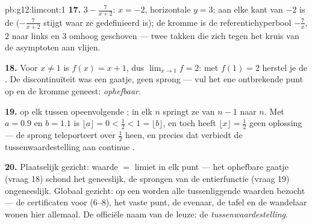 \begin{solution}{pb:g12:limcont:1}
\textbf{17.} $3 - \frac{7}{x + 2}$:  $x = -2$, horizontale
$y = 3$; aan elke kant van $-2$ is de   ($-\frac{7}{x+2}$
stijgt waar ze gedefinieerd is); de kromme is de referentiehyperbool
$-\frac7x$, $2$ naar links en $3$ omhoog geschoven --- twee takken die zich
tegen het kruis van de asymptoten aan vlijen.

\textbf{18.} Voor $x \neq 1$ is $f(x) = x + 1$, dus $\lim_{x \to 1} f = 2$:
met $f(1) = 2$ herstel je de . De discontinuïteit was een gaatje,
geen sprong --- vul het ene ontbrekende punt op en de kromme geneest:
\emph{ophefbaar}.

\textbf{19.}  op elk  tussen opeenvolgende ; in
elk  $n$ springt ze van $n - 1$ naar $n$. Met $a = 0.9$ en
$b = 1.1$ is $\lfloor a \rfloor = 0 < \frac12 < 1 = \lfloor b \rfloor$, en
toch heeft $\lfloor x \rfloor = \frac12$ geen oplossing --- de sprong
teleporteert over $\frac12$ heen, en precies dat verbiedt de
tussenwaardestelling aan continue .

\textbf{20.} Plaatselijk gezicht: waarde $=$ limiet in elk punt --- het
ophefbare gaatje (vraag 18) schond het geneeslijk, de sprongen van de
entierfunctie (vraag 19) ongeneeslijk. Globaal gezicht: op een  worden
alle tussenliggende waarden bezocht --- de certificaten voor  (6--8),
het vaste punt, de evenaar, de tafel en de wandelaar wonen hier allemaal. De
officiële naam van de leuze: de \emph{tussenwaardestelling}.
\end{solution}
